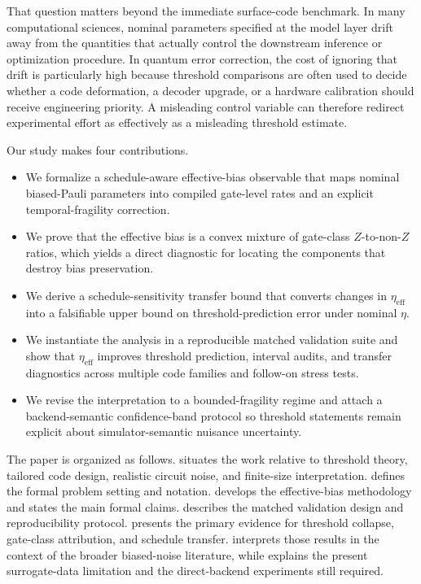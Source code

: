 \documentclass{article} %
\begin{document}
That question matters beyond the immediate surface-code benchmark. In many computational sciences, nominal parameters specified at the model layer drift away from the quantities that actually control the downstream inference or optimization procedure. In quantum error correction, the cost of ignoring that drift is particularly high because threshold comparisons are often used to decide whether a code deformation, a decoder upgrade, or a hardware calibration should receive engineering priority. A misleading control variable can therefore redirect experimental effort as effectively as a misleading threshold estimate.

Our study makes four contributions.
\begin{itemize}
\item We formalize a schedule-aware effective-bias observable that maps nominal biased-Pauli parameters into compiled gate-level rates and an explicit temporal-fragility correction.
\item We prove that the effective bias is a convex mixture of gate-class $Z$-to-non-$Z$ ratios, which yields a direct diagnostic for locating the components that destroy bias preservation.
\item We derive a schedule-sensitivity transfer bound that converts changes in $\eta_{\mathrm{eff}}$ into a falsifiable upper bound on threshold-prediction error under nominal $\eta$.
\item We instantiate the analysis in a reproducible matched validation suite and show that $\eta_{\mathrm{eff}}$ improves threshold prediction, interval audits, and transfer diagnostics across multiple code families and follow-on stress tests.
\item We revise the interpretation to a bounded-fragility regime and attach a backend-semantic confidence-band protocol so threshold statements remain explicit about simulator-semantic nuisance uncertainty.
\end{itemize}

The paper is organized as follows.  situates the work relative to threshold theory, tailored code design, realistic circuit noise, and finite-size interpretation.  defines the formal problem setting and notation.  develops the effective-bias methodology and states the main formal claims.  describes the matched validation design and reproducibility protocol.  presents the primary evidence for threshold collapse, gate-class attribution, and schedule transfer.  interprets those results in the context of the broader biased-noise literature, while  explains the present surrogate-data limitation and the direct-backend experiments still required.
\end{document}
